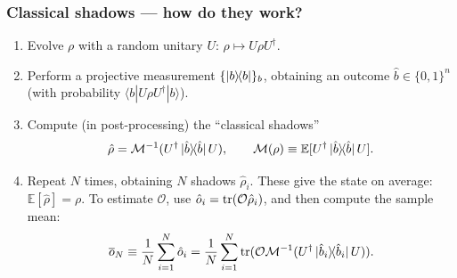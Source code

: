 \documentclass{beamer}
\begin{document}
\begin{frame}
\frametitle{Classical shadows --- how do they work?}



    \begin{enumerate}\small\setlength\itemsep{0.8em}
        \item Evolve $\rho$ with a random unitary $U$: $\rho\mapsto U\rho U^\dagger$.\pause
        \item Perform a projective measurement $\{\ketbra b\}_b$, obtaining an outcome $\hat b\in\{0,1\}^n$ (with probability $\langle b|U\rho U^\dagger|b\rangle$).\pause
        \item Compute (in post-processing) the ``classical shadows''
        \begin{equation*}
            \hat\rho = \mathcal M^{-1}(U^\dagger\ketbra*{\hat b} U),
            \qquad
            \mathcal M(\rho) \equiv \mathbb{E}[U^\dagger\ketbra*{\hat b} U].
        \end{equation*}\pause
        \item Repeat $N$ times, obtaining $N$ shadows $\hat\rho_i$. These give the state on average: $\mathbb E[\hat \rho]=\rho$.
        To estimate $\mathcal O$, use $\hat o_i=\trace(\mathcal O\hat\rho_i)$, and then compute the sample mean:
        \begin{equation*}
            \overline o_N \equiv\frac{1}{N} \sum_{i=1}^N \hat o_i
            = \frac{1}{N} \sum_{i=1}^N \trace(\mathcal O\mathcal M^{-1}(U^\dagger \ketbra*{\hat b_i} U) ).
        \end{equation*}
    \end{enumerate}
\end{frame}
\end{document}
